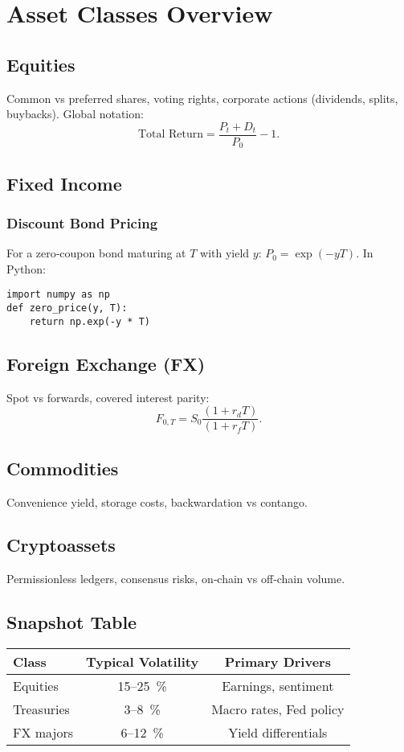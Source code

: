 \chapter{Asset Classes Overview}\label{ch:assetclasses}

\section{Equities}
Common vs preferred shares, voting rights, corporate actions
(dividends, splits, buybacks).  Global notation:
\[
\text{Total Return} = \frac{P_t + D_t}{P_0} - 1 .
\]

\section{Fixed Income}

\subsection{Discount Bond Pricing}
For a zero‑coupon bond maturing at \(T\) with yield \(y\):
\(P_0 = \exp(-yT)\).  In Python:

\begin{verbatim}
import numpy as np
def zero_price(y, T):
    return np.exp(-y * T)
\end{verbatim}

\section{Foreign Exchange (FX)}

Spot vs forwards, covered interest parity:
\[
F_{0,T} = S_0 \frac{(1+r_d T)}{(1+r_f T)} .
\]

\section{Commodities}
Convenience yield, storage costs, backwardation vs contango.

\section{Cryptoassets}
Permissionless ledgers, consensus risks, on‑chain vs off‑chain volume.

\section*{Snapshot Table}
\begin{center}
\begin{tabular}{@{}lcc@{}}
\toprule
Class & Typical Volatility & Primary Drivers \\\midrule
Equities   & 15–25 \% & Earnings, sentiment \\
Treasuries &  3–8 \% & Macro rates, Fed policy \\
FX majors  &  6–12 \% & Yield differentials \\\bottomrule
\end{tabular}
\end{center}

